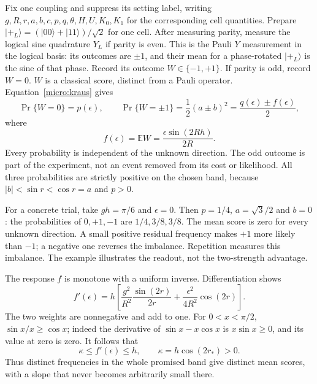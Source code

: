 \documentclass[11pt,a4paper]{article}
\numberwithin{equation}{section}
\theoremstyle{remark}
\begin{document}
Fix one coupling and suppress its setting label, writing $g,R,r,a,b,c,p,q,\theta,H,U,K_0,K_1$
for the corresponding cell quantities. Prepare $|+_L\rangle=(|00\rangle+|11\rangle)/\sqrt2$ for one cell.
After measuring parity, measure the logical sine quadrature $Y_L$ if
parity is even. This is the Pauli $Y$ measurement in the logical basis:
its outcomes are $\pm1$, and their mean for a phase-rotated
$|+_L\rangle$ is the sine of that phase. Record its outcome
$W\in\{-1,+1\}$. If parity is odd,
record $W=0$. $W$ is a classical score, distinct from a Pauli
operator. Equation~\eqref{micro:kraus} gives
\begin{equation}
 \Pr\{W=0\}=p(\epsilon),\qquad
 \Pr\{W=\pm1\}=\frac12(a\pm b)^2
              =\frac{q(\epsilon)\pm f(\epsilon)}2,
 \label{micro:caliblikelihood}
\end{equation}
where
\begin{equation}
 f(\epsilon)=\mathbb E W
       =\frac{\epsilon\sin(2Rh)}{2R}.
 \label{micro:F}
\end{equation}
Every probability is independent of the unknown direction. The odd
outcome is part of the experiment, not an event removed from its cost or
likelihood. All three probabilities are strictly positive on the chosen
band, because $|b|<\sin r<\cos r=a$ and $p>0$.

For a concrete trial, take $gh=\pi/6$ and $\epsilon=0$. Then $p=1/4$,
$a=\sqrt3/2$ and $b=0$: the probabilities of $0,+1,-1$ are
$1/4,3/8,3/8$. The mean score is zero for every unknown direction.
A small positive residual frequency makes $+1$ more likely than $-1$;
a negative one reverses the imbalance. Repetition measures this imbalance.
The example illustrates the readout, not the two-strength advantage.

The response $f$ is monotone with a uniform inverse. Differentiation
shows
\begin{equation}
 f'(\epsilon)
 =h\left[
    \frac{g^2}{R^2}\frac{\sin(2r)}{2r}
   +\frac{\epsilon^2}{4R^2}\cos(2r)\right].
 \label{micro:Fprime}
\end{equation}
The two weights are nonnegative and add to one. For $0<x<\pi/2$,
$\sin x/x\ge\cos x$; indeed the derivative of
$\sin x-x\cos x$ is $x\sin x\ge0$, and its value at zero is zero.
It follows that
\begin{equation}
 \kappa\le f'(\epsilon)\le h,
 \qquad \kappa=h\cos(2r_*)>0.
 \label{micro:kappa}
\end{equation}
Thus distinct frequencies in the whole promised band give distinct mean
scores, with a slope that never becomes arbitrarily small there.
\end{document}
